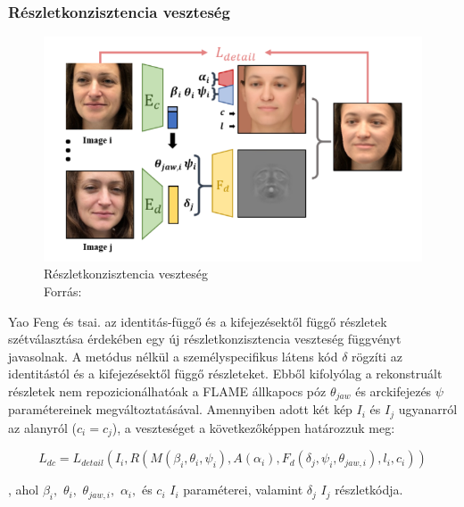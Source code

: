 \documentclass[12pt,a4]{article}
\begin{document}
            \subsubsection{Részletkonzisztencia veszteség}
    	 
        	    \begin{figure}[h]	
        	 	     \centering
        	 	     \includegraphics[width=1\linewidth]{ldetail}
        	 	     \caption{Részletkonzisztencia veszteség \\
        	 		    Forrás:\cite{deca}}
                  \label{fig:ldetail}
    	        \end{figure}
    
                Yao Feng és tsai. az identitás-függő és a kifejezésektől függő részletek
     	        szétválasztása érdekében egy új részletkonzisztencia veszteség függvényt
     	        javasolnak. A metódus nélkül a személyspecifikus látens kód $\delta$ rögzíti az
                identitástól és a kifejezésektől függő részleteket. 
                Ebből kifolyólag a rekonstruált részletek nem repozicionálhatóak a FLAME állkapocs póz $\theta_{jaw}$ és arckifejezés $\psi$ paramétereinek megváltoztatásával. Amennyiben adott két kép $I_{i}$ és $I_{j}$ ugyanarról az alanyról ($c_{i} = c_{j}$), a veszteséget a következőképpen határozzuk meg:
        
                \begin{equation*}
                L_{dc} = L_{detail}(I_{i}, R(M (\beta_{i}, \theta_{i}, \psi_{i}), A(\alpha_{i}), F_{d}(\delta_{j} , \psi_{i}, \theta_{jaw,i}), l_{i}, c_{i}))
                \end{equation*}
            
         	      , ahol $\beta_{i},$ $\theta_{i},$ $\theta_{jaw,i},$ $\alpha_{i},$ és 
                $c_{i}$ $I_{i}$ paraméterei, valamint $\delta_{j}$ $I_{j}$ részletkódja.
\end{document}
